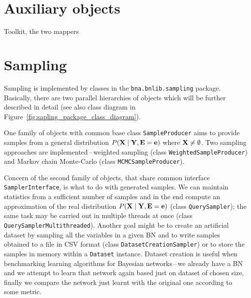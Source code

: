 \documentclass[english,cover]{fitthesis} %
\newcommand{\srccode}[1]{{\tt #1}}         %
\newcommand{\vars}[1]{{\bold{#1}}}         %
\newcommand{\todo}[1]{{\color{red}#1}}
\begin{document}
\section{Auxiliary objects}
\todo{Toolkit, the two mappers}







\section{Sampling}
Sampling is implemented by classes in the \srccode{bna.bnlib.sampling} package. Basically, there are two parallel hierarchies of objects which will be further described in detail \todo{(see also class diagram in Figure~\ref{fig:sapling_package_class_diagram})}.

One family of objects with common base class \srccode{SampleProducer} aims to provide samples from a general distribution $P(\vars{X} \mid \vars{Y}, \vars{E} = \vars{e})$ where $\vars{X} \neq \emptyset$. Two sampling approaches are implemented\,--\,weighted sampling (class \srccode{WeightedSampleProducer}) and Markov chain Monte-Carlo (class \srccode{MCMCSampleProducer}).

Concern of the second family of objects, that share common interface \srccode{SamplerInterface}, is what to do with generated samples. We can maintain statistics from a sufficient number of samples and in the end compute an approximation of the real distribution $P(\vars{X} \mid \vars{Y}, \vars{E} = \vars{e})$ (class \srccode{QuerySampler}); the same task may be carried out in multiple threads at once (class \srccode{QuerySamplerMultithreaded}). Another goal might be to create an artificial dataset by sampling all the variables in a given BN and to write samples obtained to a file in CSV format (class \srccode{DatasetCreationSampler}) or to store the samples in memory within a \srccode{Dataset} instance. Dataset creation is useful when benchmarking learning algorithms for Bayesian networks\,--\,we already have a BN and we attempt to learn that network again based just on dataset of chosen size, finally we compare the network just learnt with the original one according to some metric.
\end{document}
